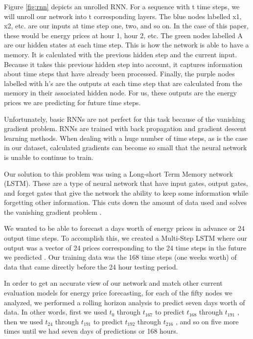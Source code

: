 \documentclass[sigconf]{acmart}
\begin{document}
Figure \ref{fig:rnn} depicts an unrolled RNN. For a sequence with t time steps, we will unroll our network into t corresponding layers. The blue nodes labelled x1,  x2, etc. are our inputs at time step one, two, and so on. In the case of this paper, these would be energy prices at hour 1, hour 2, etc. The green nodes labelled A are our hidden states at each time step. This is how the network is able to have a memory. It is calculated with the previous hidden step and the current input. Because it takes this previous hidden step into account, it captures information about time steps that have already been processed. Finally, the purple nodes labelled with h’s are the outputs at each time step that are calculated from the memory in their associated hidden node. For us, these outputs are the energy prices we are predicting for future time steps. 

Unfortunately, basic RNNs are not perfect for this task because of the vanishing gradient problem. RNNs are trained with back propagation and gradient descent learning methods. When dealing with a huge number of time steps, as is the case in our dataset, calculated gradients can become so small that the neural network is unable to continue to train. 

Our solution to this problem was using a Long-short Term Memory network (LSTM). These are a type of neural network that have input gates, output gates, and forget gates that give the network the ability to keep some information while forgetting other information. This cuts down the amount of data used and solves the vanishing gradient problem \cite{Dasgupta2018}. 

We wanted to be able to forecast a days worth of energy prices in advance or 24 output time steps. To accomplish this, we created a Multi-Step LSTM where our output was a vector of 24 prices corresponding to the 24 time steps in the future we predicted \cite{Brownlee2018}. Our training data was the 168 time steps (one weeks worth) of data that came directly before the 24 hour testing period.

In order to get an accurate view of our network and match other current evaluation models for energy price forecasting, for each of the fifty nodes we analyzed, we performed a rolling horizon analysis to predict seven days worth of data. In other words, first we used $t_{0}$ through $t_{167}$ to predict $t_{168}$ through $t_{191}$ , then we used $t_{24}$ through $t_{191}$ to predict $t_{192}$ through $t_{216}$ , and so on five more times until we had seven days of predictions or 168 hours.
\end{document}
